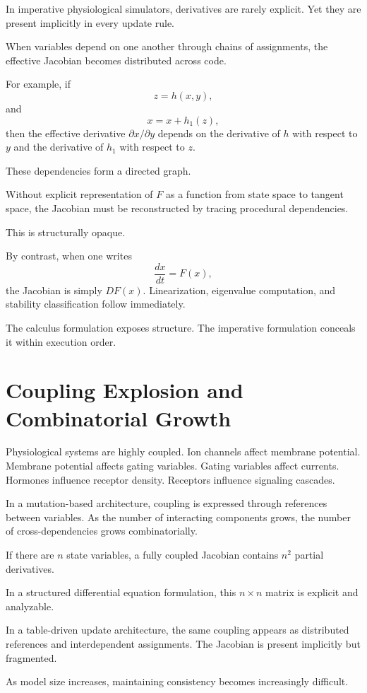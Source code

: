 \documentclass[12pt]{book}
\begin{document}
In imperative physiological simulators, derivatives are rarely explicit. Yet they are present implicitly in every update rule.

When variables depend on one another through chains of assignments, the effective Jacobian becomes distributed across code.

For example, if
\[
z = h(x,y),
\]
and
\[
x = x + h_1(z),
\]
then the effective derivative $\partial x/\partial y$ depends on the derivative of $h$ with respect to $y$ and the derivative of $h_1$ with respect to $z$.

These dependencies form a directed graph.

Without explicit representation of $F$ as a function from state space to tangent space, the Jacobian must be reconstructed by tracing procedural dependencies.

This is structurally opaque.

By contrast, when one writes
\[
\frac{dx}{dt} = F(x),
\]
the Jacobian is simply $DF(x)$. Linearization, eigenvalue computation, and stability classification follow immediately.

The calculus formulation exposes structure. The imperative formulation conceals it within execution order.

\section{Coupling Explosion and Combinatorial Growth}

Physiological systems are highly coupled. Ion channels affect membrane potential. Membrane potential affects gating variables. Gating variables affect currents. Hormones influence receptor density. Receptors influence signaling cascades.

In a mutation-based architecture, coupling is expressed through references between variables. As the number of interacting components grows, the number of cross-dependencies grows combinatorially.

If there are $n$ state variables, a fully coupled Jacobian contains $n^2$ partial derivatives.

In a structured differential equation formulation, this $n \times n$ matrix is explicit and analyzable.

In a table-driven update architecture, the same coupling appears as distributed references and interdependent assignments. The Jacobian is present implicitly but fragmented.

As model size increases, maintaining consistency becomes increasingly difficult.
\end{document}
